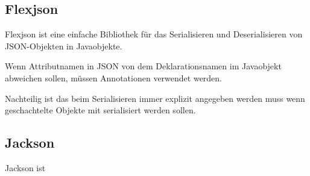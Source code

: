 \subsection{Flexjson}
Flexjson ist eine einfache Bibliothek f\"ur das Serialisieren und Deserialisieren von \ac{JSON}-Objekten in Javaobjekte.

Wenn Attributnamen in \ac{JSON} von dem Deklarationsnamen im Javaobjekt abweichen sollen, m\"ussen Annotationen verwendet werden.

Nachteilig ist das beim Serialisieren immer explizit angegeben werden muss wenn geschachtelte Objekte mit serialisiert werden sollen.
\subsection{Jackson}
Jackson ist 